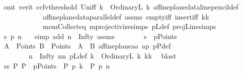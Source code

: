 \begin{isabellebody}
\ {\isacharparenleft}{\kern0pt}smt\ {\isacharparenleft}{\kern0pt}verit{\isacharcomma}{\kern0pt}\ ccfv{\isacharunderscore}{\kern0pt}threshold{\isacharparenright}{\kern0pt}\ Un{\isacharunderscore}{\kern0pt}iff\ {\isacartoucheopen}k\ {\isacharequal}{\kern0pt}\ OrdinaryL\ k{}{\isacartoucheclose}\ affine{\isacharunderscore}{\kern0pt}plane{\isacharunderscore}{\kern0pt}data{\isachardot}{\kern0pt}line{\isacharunderscore}{\kern0pt}pencil{\isacharunderscore}{\kern0pt}def\ \isanewline
\ \ \ \ \ \ \ \ \ \ \ \ affine{\isacharunderscore}{\kern0pt}plane{\isacharunderscore}{\kern0pt}data{\isachardot}{\kern0pt}parallel{\isacharunderscore}{\kern0pt}def\ assms{\isacharparenleft}{\kern0pt}{}{\isacharparenright}{\kern0pt}\ empty{\isacharunderscore}{\kern0pt}iff\ insert{\isacharunderscore}{\kern0pt}iff\ kk\isanewline
\ \ \ \ \ \ \ \ \ \ \ \ mem{\isacharunderscore}{\kern0pt}Collect{\isacharunderscore}{\kern0pt}eq\ mprojectivize{\isachardot}{\kern0pt}simps{\isacharparenleft}{\kern0pt}{}{\isacharparenright}{\kern0pt}\ pLdef\ projLine{\isachardot}{\kern0pt}simps{\isacharparenleft}{\kern0pt}{}{\isacharparenright}{\kern0pt}{\isacharparenright}{\kern0pt}\ \isanewline
\ \ \ \ \ \ \isamarkupfalse%
\ {\isachardoublequoteopen}{\isacharquery}{\kern0pt}s\ p{\isasymlhd}\ n{\isachardoublequoteclose}\ \ \isamarkupfalse%
\ {\isacharparenleft}{\kern0pt}simp\ add{\isacharcolon}{\kern0pt}\ {\isacartoucheopen}n\ {\isacharequal}{\kern0pt}\ Infty{\isacartoucheclose}\ assms{\isacharparenright}{\kern0pt}\isanewline
\ \ \ \ \ \ \isamarkupfalse%
\ {\isachardoublequoteopen}{\isacharquery}{\kern0pt}s\ {\isasymin}\ pPoints{\isachardoublequoteclose}\ \ \isamarkupfalse%
\ {\isacartoucheopen}A\ {\isasymin}\ Points{\isacartoucheclose}\ {\isacartoucheopen}B\ {\isasymin}\ Points\ {\isasymand}\ A\ {\isasymnoteq}\ B{\isacartoucheclose}\ affine{\isacharunderscore}{\kern0pt}plane{\isachardot}{\kern0pt}a{}a\ ap\ pPdef\isanewline
\ \ \ \ \ \ \ \ {\isacartoucheopen}n\ {\isacharequal}{\kern0pt}\ Infty{\isacartoucheclose}\ nn\ pLdef\ {\isacartoucheopen}k\ {\isacharequal}{\kern0pt}\ OrdinaryL\ k{}{\isacartoucheclose}\ kk\ \isamarkupfalse%
\ blast\isanewline
\ \ \ \ \ \ \isamarkupfalse%
\ \isamarkupfalse%
\ ss{\isacharcolon}{\kern0pt}\ {\isachardoublequoteopen}{\isasymexists}P{\isachardot}{\kern0pt}\ P\ {\isasymin}\ pPoints\ {\isasymand}\ P\ p{\isasymlhd}\ k\ {\isasymand}\ P\ p{\isasymlhd}\ n{\isachardoublequoteclose}\isanewline

\end{isabellebody}
